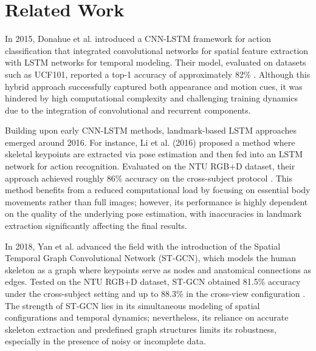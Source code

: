 \documentclass[journal,onecolumn, 11pt]{IEEEtran}
\begin{document}




\section{Related Work}

In 2015, Donahue et al. introduced a CNN-LSTM framework for action classification that integrated convolutional networks for spatial feature extraction with LSTM networks for temporal modeling. Their model, evaluated on datasets such as UCF101, reported a top-1 accuracy of approximately 82\% \cite{donahue2015}. Although this hybrid approach successfully captured both appearance and motion cues, it was hindered by high computational complexity and challenging training dynamics due to the integration of convolutional and recurrent components.

Building upon early CNN-LSTM methods, landmark-based LSTM approaches emerged around 2016. For instance, Li et al. (2016) proposed a method where skeletal keypoints are extracted via pose estimation and then fed into an LSTM network for action recognition. Evaluated on the NTU RGB+D dataset, their approach achieved roughly 86\% accuracy on the cross-subject protocol \cite{li2017}. This method benefits from a reduced computational load by focusing on essential body movements rather than full images; however, its performance is highly dependent on the quality of the underlying pose estimation, with inaccuracies in landmark extraction significantly affecting the final results.

In 2018, Yan et al. advanced the field with the introduction of the Spatial Temporal Graph Convolutional Network (ST-GCN), which models the human skeleton as a graph where keypoints serve as nodes and anatomical connections as edges. Tested on the NTU RGB+D dataset, ST-GCN obtained 81.5\% accuracy under the cross-subject setting and up to 88.3\% in the cross-view configuration \cite{yan2018}. The strength of ST-GCN lies in its simultaneous modeling of spatial configurations and temporal dynamics; nevertheless, its reliance on accurate skeleton extraction and predefined graph structures limits its robustness, especially in the presence of noisy or incomplete data.
\end{document}
